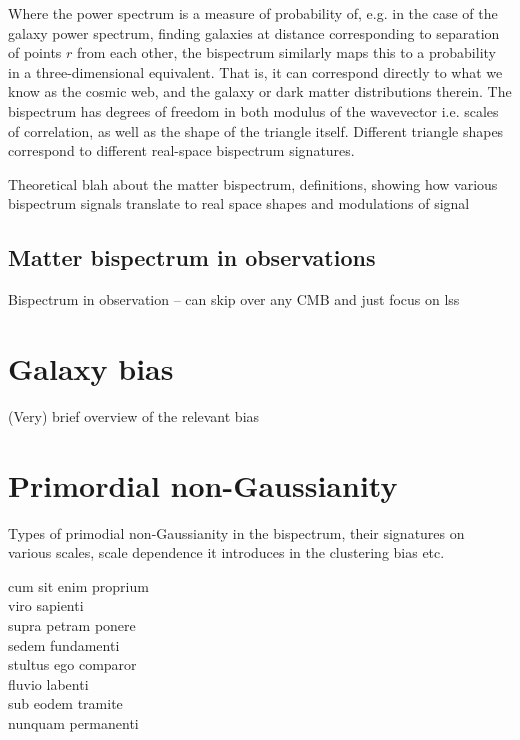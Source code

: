Where the power spectrum is a measure of probability of, e.g. in the case of the galaxy power spectrum, finding galaxies at distance corresponding to separation of points $r$ from each other, the bispectrum similarly maps this to a probability in a three-dimensional equivalent. That is, it can correspond directly to what we know as the cosmic web, and the galaxy or dark matter distributions therein. The bispectrum has degrees of freedom in both modulus of the wavevector i.e. scales of correlation, as well as the shape of the triangle itself. Different triangle shapes correspond to different real-space bispectrum signatures.

Theoretical blah about the matter bispectrum, definitions, showing how various bispectrum signals translate to real space shapes and modulations of signal

\subsection{Matter bispectrum in observations}

Bispectrum in observation -- can skip over any CMB and just focus on lss

\section{Galaxy bias}
\label{section:galaxybias}


(Very) brief overview of the relevant bias


\section{Primordial non-Gaussianity}

Types of primodial non-Gaussianity in the bispectrum, their signatures on various scales, scale dependence it introduces in the clustering bias etc. 


cum sit enim proprium \\
viro sapienti \\
supra petram ponere \\
sedem fundamenti \\
stultus ego comparor \\
fluvio labenti \\
sub eodem tramite \\
nunquam permanenti 